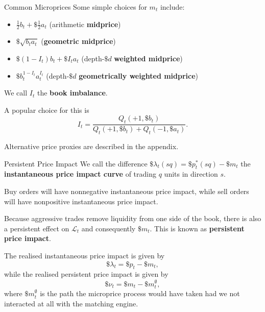 \documentclass{beamer}
\begin{document}
\begin{frame}{Common Microprices}
	Some simple choices for $m_t$ include:
	\begin{itemize}
		\item $\frac{1}{2}b_t+\$\frac{1}{2}a_t$ (arithmetic \textbf{midprice})
		\item $\$\sqrt{b_ta_t}$ (\textbf{geometric midprice})
		\item $\$(1-I_t)b_t + \$I_ta_t$ (depth-$\$d$ \textbf{weighted midprice})
		\item $\$b_t^{1-I_t}a_t^{I_t}$ (depth-$\$d$ \textbf{geometrically weighted midprice})
	\end{itemize}
	We call $I_t$ the \textbf{book imbalance}.

	\pause

	A popular choice for this is
	$$I_t=\frac{Q_t(+1,\$b_t)}{Q_t(+1,\$b_t)+Q_t(-1,\$a_t)}.$$

	Alternative price proxies are described in the appendix.
\end{frame}

\begin{frame}{Persistent Price Impact}
	We call the difference $\$\lambda_t(sq) = \$p^*_t(sq) - \$m_t$ the \textbf{instantaneous price impact curve} of trading $q$ units in direction $s$.%

	Buy orders will have nonnegative instantaneous price impact, while sell orders will have nonpositive instantaneous price impact.

	Because aggressive trades remove liquidity from one side of the book, there is also a persistent effect on $\mathcal{L}_t$ and consequently $\$m_t$. This is known as \textbf{persistent price impact}.

	The realised instantaneous price impact is given by
	$$\$\lambda_t = \$p_t - \$m_t,$$
	while the realised persistent price impact is given by
	$$\$\nu_t = \$m_t - \$m_t^\emptyset,$$
	where $\$m_t^\emptyset$ is the path the microprice process would have taken had we not interacted at all with the matching engine.
\end{frame}
\end{document}
